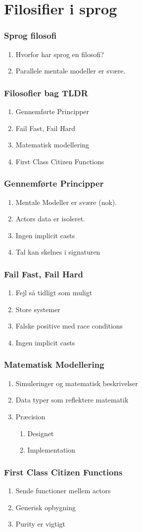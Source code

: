 \section{Filosifier i sprog}
\begin{frame}
	\frametitle{Sprog filosofi}
	\begin{enumerate}
		\item Hvorfor har sprog en filosofi?
		\item Parallele mentale modeller er svære.
	\end{enumerate}
\end{frame}

\begin{frame}
	\frametitle{Filosofier bag TLDR}
	\begin{enumerate}
		\item Gennemførte Principper
		\item Fail Fast, Fail Hard
		\item Matematisk modellering
		\item First Class Citizen Functions
	\end{enumerate}
\end{frame}

\begin{frame}
	\frametitle{Gennemførte Principper}
	\begin{enumerate}
		\item Mentale Modeller er svære (nok).
		\item Actors data er isoleret.
		\item Ingen implicit casts
		\item Tal kan skelnes i signaturen
	\end{enumerate}
\end{frame}

\begin{frame}
	\frametitle{Fail Fast, Fail Hard}
	\begin{enumerate}
		\item Fejl så tidligt som muligt
		\item Store systemer
		\item Falske positive med race conditions
		\item Ingen implicit casts
	\end{enumerate}
\end{frame}

\begin{frame}
	\frametitle{Matematisk Modellering}
	\begin{enumerate}
		\item Simuleringer og matematisk beskrivelser
		\item Data typer som reflektere matematik
		\item Præcision
		\begin{enumerate}
			\item Designet
			\item Implementation
		\end{enumerate}
	\end{enumerate}
\end{frame}

\begin{frame}
	\frametitle{First Class Citizen Functions}
	\begin{enumerate}
		\item Sende functioner mellem actors
		\item Generisk opbygning
		\item Purity er vigtigt
	\end{enumerate}
\end{frame}
